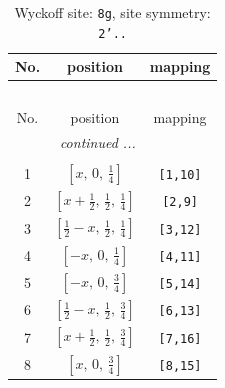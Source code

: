 \documentclass[fleqn,8pt]{jsarticle}
\begin{document}
\renewcommand{\arraystretch}{1.2}
\begin{longtable}{ccc}
\caption{Wyckoff site: {\tt 8g}, site symmetry: {\tt 2'..}}
 \\
 \hline \hline
No. & position & mapping \\ \hline \endfirsthead

\multicolumn{2}{l}{\tablename\ \thetable{}} \\
 \hline \hline
No. & position & mapping \\ \hline \endhead

 \hline \hline
\multicolumn{2}{r}{\footnotesize\it continued ...} \\ \endfoot

 \hline \hline
\multicolumn{2}{r}{} \\ \endlastfoot

1 & $\left[ x,\, 0,\, \frac{1}{4} \right]$ & {\tt [1,10]} \\ \hline
2 & $\left[ x + \frac{1}{2},\, \frac{1}{2},\, \frac{1}{4} \right]$ & {\tt [2,9]} \\ \hline
3 & $\left[ \frac{1}{2} - x,\, \frac{1}{2},\, \frac{1}{4} \right]$ & {\tt [3,12]} \\ \hline
4 & $\left[ - x,\, 0,\, \frac{1}{4} \right]$ & {\tt [4,11]} \\ \hline
5 & $\left[ - x,\, 0,\, \frac{3}{4} \right]$ & {\tt [5,14]} \\ \hline
6 & $\left[ \frac{1}{2} - x,\, \frac{1}{2},\, \frac{3}{4} \right]$ & {\tt [6,13]} \\ \hline
7 & $\left[ x + \frac{1}{2},\, \frac{1}{2},\, \frac{3}{4} \right]$ & {\tt [7,16]} \\ \hline
8 & $\left[ x,\, 0,\, \frac{3}{4} \right]$ & {\tt [8,15]} \\
\end{longtable}
\renewcommand{\arraystretch}{1.2}
\end{document}
